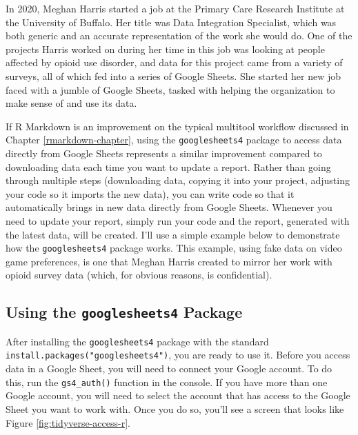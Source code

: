 \documentclass[
]{book}
\begin{document}
In 2020, Meghan Harris started a job at the Primary Care Research Institute at the University of Buffalo. Her title was Data Integration Specialist, which was both generic and an accurate representation of the work she would do. One of the projects Harris worked on during her time in this job was looking at people affected by opioid use disorder, and data for this project came from a variety of surveys, all of which fed into a series of Google Sheets. She started her new job faced with a jumble of Google Sheets, tasked with helping the organization to make sense of and use its data.

If R Markdown is an improvement on the typical multitool workflow discussed in Chapter \ref{rmarkdown-chapter}, using the \texttt{googlesheets4} package to access data directly from Google Sheets represents a similar improvement compared to downloading data each time you want to update a report. Rather than going through multiple steps (downloading data, copying it into your project, adjusting your code so it imports the new data), you can write code so that it automatically brings in new data directly from Google Sheets. Whenever you need to update your report, simply run your code and the report, generated with the latest data, will be created. I'll use a simple example below to demonstrate how the \texttt{googlesheets4} package works. This example, using fake data on video game preferences, is one that Meghan Harris created to mirror her work with opioid survey data (which, for obvious reasons, is confidential).

\hypertarget{using-the-googlesheets4-package}{%
\subsection*{\texorpdfstring{Using the \texttt{googlesheets4} Package}{Using the googlesheets4 Package}}\label{using-the-googlesheets4-package}}

After installing the \texttt{googlesheets4} package with the standard \texttt{install.packages("googlesheets4")}, you are ready to use it. Before you access data in a Google Sheet, you will need to connect your Google account. To do this, run the \texttt{gs4\_auth()} function in the console. If you have more than one Google account, you will need to select the account that has access to the Google Sheet you want to work with. Once you do so, you'll see a screen that looks like Figure \ref{fig:tidyverse-access-r}.
\end{document}
